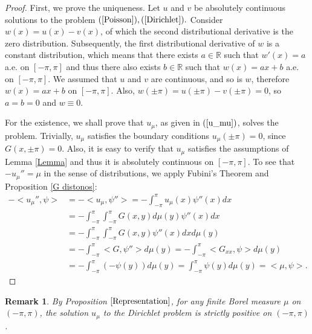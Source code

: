 \documentclass[11pt]{amsart}
\newtheorem{remark}[theorem]{Remark}
\numberwithin{equation}{section}
\begin{document}
\begin{proof}
First, we prove the uniqueness. Let \(u\) and \(v\) be absolutely continuous solutions to the problem \((\ref{Poisson}),(\ref{Dirichlet}).\) Consider \(w(x)=u(x)-v(x)\), of which the second distributional derivative is the zero distribution. Subsequently, the first distributional derivative of \(w\) is a constant distribution, which means that there exists \(a\in\mathbb{R}\) such that \(w'(x)=a\) a.e. on \([-\pi,\pi]\) and thus there also exists \(b\in\mathbb{R}\) such that \(w(x)=ax+b\) a.e. on \([-\pi,\pi]\). We assumed that \(u\) and \(v\) are continuous, and so is \(w\), therefore \(w(x)=ax+b\) on \([-\pi,\pi]\). Also, \(w(\pm\pi)=u(\pm\pi)-v(\pm\pi)=0\), so \(a=b=0\) and \(w\equiv0\).
\par For the existence, we shall prove that \(u_\mu\), as given in \((\ref{u_mu})\), solves the problem. Trivially, \(u_\mu\) satisfies the boundary conditions \(u_\mu(\pm\pi)=0\), since \(G(x,\pm\pi)=0.\) Also, it is easy to verify that \(u_\mu\) satisfies the assumptions of Lemma \ref{Lemma} and thus it is absolutely continuous on \([-\pi,\pi]\). To see that \(-u_\mu''=\mu\) in the sense of distributions, we apply Fubini's Theorem and Proposition \ref{G distonos}:
\begin{align*}
-<u_\mu'',\psi>&=-<u_\mu,\psi''>=-\int_{-\pi}^\pi u_\mu(x)\psi''(x)dx\\
&=-\int_{-\pi}^\pi\int_{-\pi}^\pi G(x,y)d\mu(y)\psi''(x)dx\\
&=-\int_{-\pi}^\pi\int_{-\pi}^\pi G(x,y)\psi''(x)dxd\mu(y)\\
&=-\int_{-\pi}^\pi<G,\psi''>d\mu(y)=-\int_{-\pi}^\pi<G_{xx},\psi>d\mu(y)\\
&=-\int_{-\pi}^\pi(-\psi(y))d\mu(y)=\int_{-\pi}^\pi\psi(y)d\mu(y)=<\mu,\psi>.
\end{align*}
\end{proof}
\begin{remark}\label{remark thetikes luseis}
\textnormal{By Proposition \(\ref{Representation}\), for any finite Borel measure \(\mu\) on \((-\pi,\pi)\), the solution \(u_\mu\) to the Dirichlet problem is strictly positive on \((-\pi,\pi)\).}
\end{remark}
\end{document}

